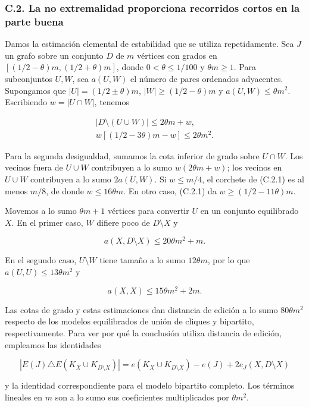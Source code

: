 \documentclass[spanish,11pt,a4paper]{article}
\begin{document}
\subsubsection{C.2. La no extremalidad proporciona recorridos cortos en la parte buena}\label{c.2.-la-no-extremalidad-proporciona-recorridos-cortos-en-la-parte-buena}

Damos la estimación elemental de estabilidad que se utiliza repetidamente. Sea \(J\) un grafo sobre un conjunto \(D\) de \(m\) vértices con grados en \([(1/2-\theta)m,(1/2+\theta)m]\), donde \(0<\theta\le1/100\) y \(\theta m\ge1\). Para subconjuntos \(U,W\), sea \(a(U,W)\) el número de pares ordenados adyacentes. Supongamos que \(|U|=(1/2\pm\theta)m\), \(|W|\ge(1/2-\theta)m\) y \(a(U,W)\le\theta m^2\). Escribiendo \(w=|U\cap W|\), tenemos

\[\begin{gathered}
|D\setminus(U\cup W)|\le2\theta m+w,
\\
w[(1/2-3\theta)m-w]\le2\theta m^2.
\end{gathered}
\tag{C.2.1}\]

Para la segunda desigualdad, sumamos la cota inferior de grado sobre \(U\cap W\). Los vecinos fuera de \(U\cup W\) contribuyen a lo sumo \(w(2\theta m+w)\); los vecinos en \(U\cup W\) contribuyen a lo sumo \(2a(U,W)\). Si \(w\le m/4\), el corchete de (C.2.1) es al menos \(m/8\), de donde \(w\le16\theta m\). En otro caso, (C.2.1) da \(w\ge(1/2-11\theta)m\).

Movemos a lo sumo \(\theta m+1\) vértices para convertir \(U\) en un conjunto equilibrado \(X\). En el primer caso, \(W\) difiere poco de \(D\setminus X\) y

\[a(X,D\setminus X)\le20\theta m^2+m.\]

En el segundo caso, \(U\setminus W\) tiene tamaño a lo sumo \(12\theta m\), por lo que \(a(U,U)\le13\theta m^2\) y

\[a(X,X)\le15\theta m^2+2m.\]

Las cotas de grado y estas estimaciones dan distancia de edición a lo sumo \(80\theta m^2\) respecto de los modelos equilibrados de unión de cliques y bipartito, respectivamente. Para ver por qué la conclusión utiliza distancia de edición, empleamos las identidades

\[|E(J)\triangle E(K_X\cup K_{D\setminus X})|
=e(K_X\cup K_{D\setminus X})-e(J)+2e_J(X,D\setminus X)\]

y la identidad correspondiente para el modelo bipartito completo. Los términos lineales en \(m\) son a lo sumo sus coeficientes multiplicados por \(\theta m^2\).
\end{document}
